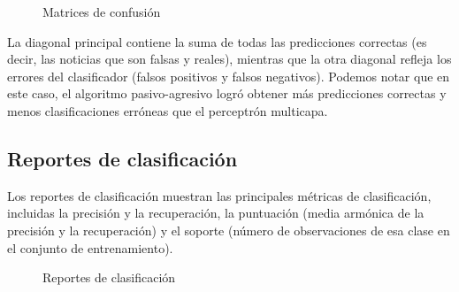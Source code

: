 \documentclass[letterpaper,11pt]{article}
\begin{document}
\begin{figure}[ht]
    \centering
    \qquad
    \caption{Matrices de confusión}%
    \label{fig: confusion}%
\end{figure}

La diagonal principal contiene la suma de todas las predicciones correctas 
(es decir, las noticias que son falsas y reales), mientras que la otra diagonal
refleja los errores del clasificador (falsos positivos y falsos negativos). 
Podemos notar que en este caso, el algoritmo pasivo-agresivo logró obtener 
más predicciones correctas y menos clasificaciones erróneas que el perceptrón 
multicapa. 
\subsection{Reportes de clasificación}

Los reportes de clasificación muestran las principales métricas de clasificación,
incluidas la precisión y la recuperación, la puntuación (media armónica de la
precisión y la recuperación) y el soporte (número de observaciones de esa clase 
en el conjunto de entrenamiento).

\begin{figure}[ht]
    \centering
    \qquad
    \caption{Reportes de clasificación}
    \label{fig: reportes}
\end{figure}
\end{document}
